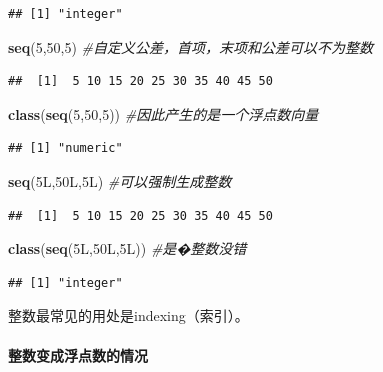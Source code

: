\documentclass[]{book}
\newenvironment{Shaded}{\begin{snugshade}}{\end{snugshade}}
\newcommand{\CommentTok}[1]{\textcolor[rgb]{0.56,0.35,0.01}{\textit{#1}}}
\newcommand{\DecValTok}[1]{\textcolor[rgb]{0.00,0.00,0.81}{#1}}
\newcommand{\KeywordTok}[1]{\textcolor[rgb]{0.13,0.29,0.53}{\textbf{#1}}}
\newcommand{\NormalTok}[1]{#1}
\let\oldparagraph\paragraph
\renewcommand{\paragraph}[1]{\oldparagraph{#1}\mbox{}}
\begin{document}
\begin{verbatim}
## [1] "integer"
\end{verbatim}

\begin{Shaded}
\begin{Highlighting}[]
\KeywordTok{seq}\NormalTok{(}\DecValTok{5}\NormalTok{,}\DecValTok{50}\NormalTok{,}\DecValTok{5}\NormalTok{) }\CommentTok{#自定义公差，首项，末项和公差可以不为整数}
\end{Highlighting}
\end{Shaded}

\begin{verbatim}
##  [1]  5 10 15 20 25 30 35 40 45 50
\end{verbatim}

\begin{Shaded}
\begin{Highlighting}[]
\KeywordTok{class}\NormalTok{(}\KeywordTok{seq}\NormalTok{(}\DecValTok{5}\NormalTok{,}\DecValTok{50}\NormalTok{,}\DecValTok{5}\NormalTok{)) }\CommentTok{#因此产生的是一个浮点数向量}
\end{Highlighting}
\end{Shaded}

\begin{verbatim}
## [1] "numeric"
\end{verbatim}

\begin{Shaded}
\begin{Highlighting}[]
\KeywordTok{seq}\NormalTok{(5L,50L,5L) }\CommentTok{#可以强制生成整数}
\end{Highlighting}
\end{Shaded}

\begin{verbatim}
##  [1]  5 10 15 20 25 30 35 40 45 50
\end{verbatim}

\begin{Shaded}
\begin{Highlighting}[]
\KeywordTok{class}\NormalTok{(}\KeywordTok{seq}\NormalTok{(5L,50L,5L)) }\CommentTok{#是�整数没错}
\end{Highlighting}
\end{Shaded}

\begin{verbatim}
## [1] "integer"
\end{verbatim}

整数最常见的用处是indexing（索引）。

\paragraph{整数变成浮点数的情况}
\end{document}
